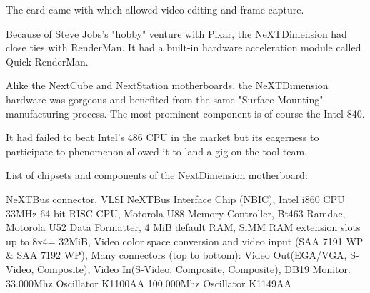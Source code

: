 \par
\par
The card came with  which allowed video editing and frame capture.
\par
{}
\par
Because of Steve Jobs's "hobby" venture with Pixar, the NeXTDimension had close ties with RenderMan. It had a built-in hardware acceleration module called Quick RenderMan.\\
\par
\par






\par
Alike the NextCube and NextStation motherboards, the NeXTDimension hardware was gorgeous and benefited from the same "Surface Mounting" manufacturing process. The most prominent component is of course the Intel 840.\\
\par It had failed to beat Intel's 486 CPU in the market but its eagerness to participate to \doom{} phenomenon allowed it to land a gig on the tool team.\\
\par
{}
\par
{}
\par
List of chipsets and components of the NextDimension motherboard:\\
\par 
{} NeXTBus connector,
 VLSI NeXTBus Interface Chip (NBIC),
 Intel i860 CPU 33MHz 64-bit RISC CPU,
 Motorola U88 Memory Controller,
 Bt463 Ramdac,
 Motorola U52 Data Formatter,
 4 MiB default RAM,
 SiMM RAM extension slots up to 8x4= 32MiB,
 Video color space conversion and video input (SAA 7191 WP \& SAA 7192 WP), 
 Many connectors (top to bottom): Video Out(EGA/VGA, S-Video, Composite), Video In(S-Video, Composite, Composite), DB19 Monitor.
 33.000Mhz Oscillator K1100AA
 100.000Mhz Oscillator K1149AA
\par


